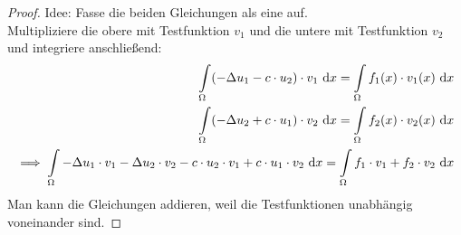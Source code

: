 \documentclass[12pt,a4paper]{article}
\begin{document}
\begin{proof}
Idee: Fasse die beiden Gleichungen als eine auf.\\
Multipliziere die obere mit Testfunktion $v_1$ und die untere mit Testfunktion $v_2$ und integriere anschließend:
\begin{align*}
\int\limits_\Omega(-\Delta u_1-c\cdot u_2)\cdot v_1\text{ d} x=\int\limits_\Omega f_1(x)\cdot v_1(x)\text{ d} x\\
\int\limits_\Omega(-\Delta u_2+c\cdot u_1)\cdot v_2\text{ d} x=\int\limits_\Omega f_2(x)\cdot v_2(x)\text{ d} x\\
\implies
\int\limits_\Omega -\Delta u_1\cdot v_1-\Delta u_2\cdot v_2-c\cdot u_2\cdot v_1+c\cdot u_1\cdot v_2\text{ d} x=\int\limits_\Omega f_1\cdot v_1+f_2\cdot v_2\text{ d} x
\end{align*}
Man kann die Gleichungen addieren, weil die Testfunktionen unabhängig voneinander sind.

\end{proof}
\end{document}
